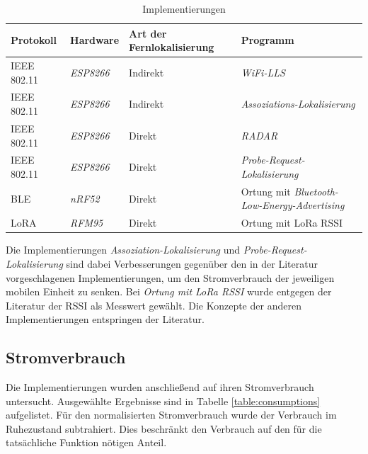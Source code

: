 \begin{table}[h]
	\centering
	\caption{Implementierungen}
	\label{table:ranges}
	\begin{tabular}{l|l|p{2.5cm}|p{5.8cm}}
		Protokoll & Hardware & Art der Fernlokalisierung & Programm \\
		\hline
		IEEE 802.11 & \emph{ESP8266} & Indirekt & \emph{WiFi-LLS} \cite{chen2007design} \\
		IEEE 802.11 & \emph{ESP8266} & Indirekt & \emph{Assoziations-Lokalisierung} \\
		\hline
		IEEE 802.11 & \emph{ESP8266} & Direkt & \emph{RADAR} \cite{bahl2000radar} \\
		IEEE 802.11 & \emph{ESP8266} & Direkt & \emph{Probe-Request-Lokalisierung} \\
		\hline
		BLE & \emph{nRF52} & Direkt & Ortung mit \emph{Bluetooth-Low-Energy-Advertising} \cite{jianyong2014rssi} \\
		\hline
		LoRA & \emph{RFM95} & Direkt & Ortung mit LoRa RSSI \\
	\end{tabular}
\end{table}

Die Implementierungen \emph{Assoziation-Lokalisierung} und \emph{Probe-Request-Lokalisierung} sind dabei Verbesserungen gegenüber den in der Literatur vorgeschlagenen Implementierungen, um den Stromverbrauch der jeweiligen mobilen Einheit zu senken.
Bei \emph{Ortung mit LoRa RSSI} wurde entgegen der Literatur der RSSI als Messwert gewählt.
Die Konzepte der anderen Implementierungen entspringen der Literatur.

\subsection{Stromverbrauch}
Die Implementierungen wurden anschließend auf ihren Stromverbrauch untersucht.
Ausgewählte Ergebnisse sind in Tabelle \ref{table:consumptions} aufgelistet.
Für den normalisierten Stromverbrauch wurde der Verbrauch im Ruhezustand subtrahiert. 
Dies beschränkt den Verbrauch auf den für die tatsächliche Funktion nötigen Anteil.

